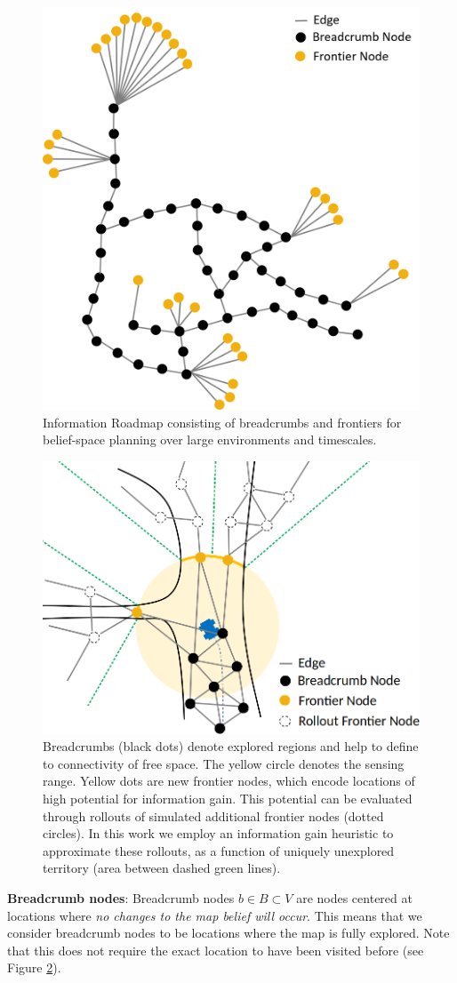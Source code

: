 \documentclass{article}
\newcommand{\ph}[1]{{\textbf{#1}:}} %
\begin{document}
\begin{figure}[ht!]
  \includegraphics[width=.48\textwidth]{figures/irm.png}
  \caption{Information Roadmap consisting of breadcrumbs and frontiers for belief-space planning over large environments and timescales.}
  \label{fig:irm_large}
\end{figure}

\begin{figure}[ht!]
  \includegraphics[width=.48\textwidth]{figures/irm_breadcrumbs_frontiers.png}
  \caption{Breadcrumbs (black dots) denote explored regions and help to define to connectivity of free space.  The yellow circle denotes the sensing range.  Yellow dots are new frontier nodes, which encode locations of high potential for information gain.  This potential can be evaluated through rollouts of simulated additional frontier nodes (dotted circles).  In this work we employ an information gain heuristic to approximate these rollouts, as a function of uniquely unexplored territory (area between dashed green lines).}
  \label{fig:breadcrumbs_frontiers}
\end{figure}

\ph{Breadcrumb nodes}
Breadcrumb nodes $b\in B \subset V$ are nodes centered at locations where \textit{no changes to the map belief will occur}.  This means that we consider breadcrumb nodes to be locations where the map is fully explored.  Note that this does not require the exact location to have been visited before (see Figure \ref{fig:breadcrumbs_frontiers}). 
\end{document}
